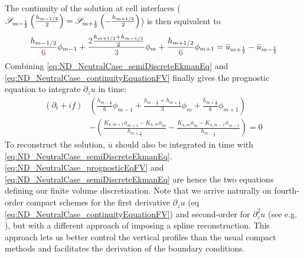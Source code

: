 The continuity of the solution at cell interfaces (${\cal S}_{m-\frac{1}{2}}\left(\frac{h_{m-1/2}}{2}\right) = {\cal S}_{m+\frac{1}{2}}\left(-\frac{h_{m+1/2}}{2}\right)$) is then equivalent to
%
\begin{equation}
\label{eq:ND_NeutralCase_continuityEquationFV}
	\frac{h_{m-1/2}}{\emphase{6}} \phi_{m-1} 
	+ \frac{\emphase{2}\frac{h_{m+1/2}+h_{m-1/2}}{2}}
		{\emphase{3}} \phi_m  
	+ \frac{h_{m+1/2}}{\emphase{6}} \phi_{m+1} = \Bar{u}_{m+\frac{1}{2}} - \Bar{u}_{m-\frac{1}{2}}
\end{equation}
Combining \eqref{eq:ND_NeutralCase_semiDiscreteEkmanEq}
and \eqref{eq:ND_NeutralCase_continuityEquationFV} finally gives
the prognostic equation to integrate
$\partial_z u$ in time:
\begin{equation}
\begin{aligned}
\label{eq:ND_NeutralCase_prognosticEqFV}
	(\partial_t + if) &\left( \frac{h_{m-\frac{1}{2}}}{6}
				\phi_{m-1}
	+ \frac{h_{m-\frac{1}{2}} + h_{m+\frac{1}{2}}}{3} \phi_m
	+ \frac{h_{m+\frac{1}{2}}}{6} \phi_{m+1} \right) \\
	&-
    \left(
	\frac{K_{u, m+1}\phi_{m+1} - K_{u, m}\phi_{m}}{ h_{m+\frac{1}{2}}} -
	\frac{K_{u, m}\phi_{m} - K_{u,m-1}\phi_{m-1}}{h_{m-\frac{1}{2}}}
    \right)
= 0
\end{aligned}
\end{equation}
To reconstruct the solution, $\overline{u}$ should also be 
integrated in time with \eqref{eq:ND_NeutralCase_semiDiscreteEkmanEq}.
\eqref{eq:ND_NeutralCase_prognosticEqFV} and
\eqref{eq:ND_NeutralCase_semiDiscreteEkmanEq} are hence the two 
equations defining our finite volume discretization.
Note that we arrive naturally on fourth-order compact schemes for
the first derivative $\partial_z u$
(eq \eqref{eq:ND_NeutralCase_continuityEquationFV})
and second-order for
$\partial_z^2 u$ (see e.g. \citep{piller_finite-volume_2004}),
but with a different approach of imposing a spline reconstruction.
This approach lets us better control the vertical profiles
than the usual compact methods and
facilitates the derivation of the boundary conditions.
